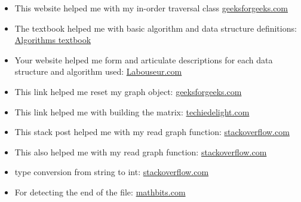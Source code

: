 \documentclass[letterpaper, 10pt,DIV=13]{scrartcl}
\numberwithin{equation}{section} %
\numberwithin{figure}{section} %
\numberwithin{table}{section} %
\begin{document}
\begin{itemize}
    \item This website helped me with my in-order traversal class
    \href{https://www.geeksforgeeks.org/tree-traversals-inorder-preorder-and-postorder/#}
    {geeksforgeeks.com}

    \item The textbook helped me with basic algorithm and data structure definitions: \href{http://jeffe.cs.illinois.edu/teaching/algorithms/book/Algorithms-JeffE.pdf}{Algorithms textbook}

    \item Your website helped me form and articulate descriptions for each data structure and algorithm used: \href{https://www.labouseur.com/courses/algorithms/}{Labouseur.com}

    \item This link helped me reset my graph object: \href{https://www.geeksforgeeks.org/vector-erase-and-clear-in-cpp/#}{geeksforgeeks.com}

    \item This link helped me with building the matrix: \href{https://www.techiedelight.com/initialize-2d-array-with-zeroes-c/}{techiedelight.com}

    \item This stack post helped me with my read graph function: \href{https://stackoverflow.com/questions/2340281/check-if-a-string-contains-a-string-in-c}{stackoverflow.com}

    \item This also helped me with my read graph function: \href{https://stackoverflow.com/questions/3827926/what-does-stringnpos-mean-in-this-code}{stackoverflow.com}

    \item type conversion from string to int: \href{https://stackoverflow.com/questions/7663709/how-can-i-convert-a-stdstring-to-int}{stackoverflow.com}
    
    \item For detecting the end of the file: \href{https://mathbits.com/MathBits/CompSci/Files/End.htm#:~:text=C%2B%2B%20provides%20a%20special%20function,from%20an%20input%20file%20stream.}{mathbits.com}


    
\end{itemize}

\pagebreak

% 
\end{document}

